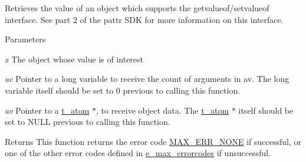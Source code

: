 Retrieves the value of an object which supports the {\ttfamily getvalueof/setvalueof} interface. See part 2 of the pattr SDK for more information on this interface.


\begin{DoxyParams}{Parameters}
\item[{\em x}]The object whose value is of interest \item[{\em ac}]Pointer to a long variable to receive the count of arguments in {\ttfamily av}. The long variable itself should be set to 0 previous to calling this function. \item[{\em av}]Pointer to a \hyperlink{structt__atom}{t\_\-atom} $\ast$, to receive object data. The \hyperlink{structt__atom}{t\_\-atom} $\ast$ itself should be set to NULL previous to calling this function.\end{DoxyParams}
\begin{DoxyReturn}{Returns}
This function returns the error code \hyperlink{group__misc_gga0764dd6c02b76cca7d053ae50555d69da6d22f77fef8b1e1b074cef5d29d935fd}{MAX\_\-ERR\_\-NONE} if successful, or one of the other error codes defined in \hyperlink{group__misc_ga0764dd6c02b76cca7d053ae50555d69d}{e\_\-max\_\-errorcodes} if unsuccessful.
\end{DoxyReturn}
